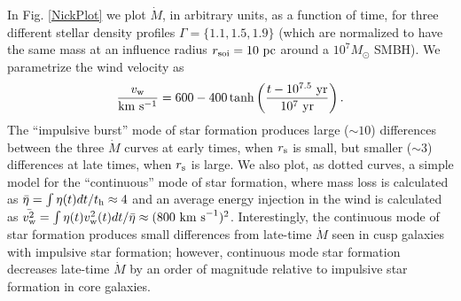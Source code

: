 \documentclass[usenatbib,fleqn]{mn2e}
\begin{document}
In Fig. \ref{NickPlot} we plot $\dot{M}$, in arbitrary units, as a
function of time, for three different stellar density profiles $\Gamma
= \{1.1, 1.5, 1.9\}$ (which are normalized to have the same mass at an
influence radius $r
_{\rm soi}=10~{\rm pc}$ around a $10^7M_\odot$ SMBH).  We parametrize the wind velocity as 
\begin{equation}
\frac{v_{\rm w}}{\rm km~s^{-1}}=600-400\tanh\left( \frac{t-10^{7.5}~{\rm yr}}{10^{7}~{\rm yr}}\right).
\end{equation}
The ``impulsive burst'' mode of star formation produces large ($\sim 10$) differences between the three $\dot{M}$ curves at early times, when $r_{\rm s}$ is small, but smaller ($\sim 3$) differences at late times, when $r_{\rm s}$ is large.  We also plot, as dotted curves, a simple model for the ``continuous'' mode of star formation, where mass loss is calculated as $\bar{\eta} = \int\eta(t)dt/t_{\rm h} \approx 4$ and an average energy injection in the wind is calculated as $\bar{v_{\rm w}^2}=\int\eta(t)v_{\rm w}^2(t)dt/\bar{\eta} \approx (800~{\rm km~s}^{-1})^2$.  Interestingly, the continuous mode of star formation produces small differences from late-time $\dot{M}$ seen in cusp galaxies with impulsive star formation; however, continuous mode star formation decreases late-time $\dot{M}$ by an order of magnitude relative to impulsive star formation in core galaxies.
  \footnotesize{
    
    
  }
\end{document}
